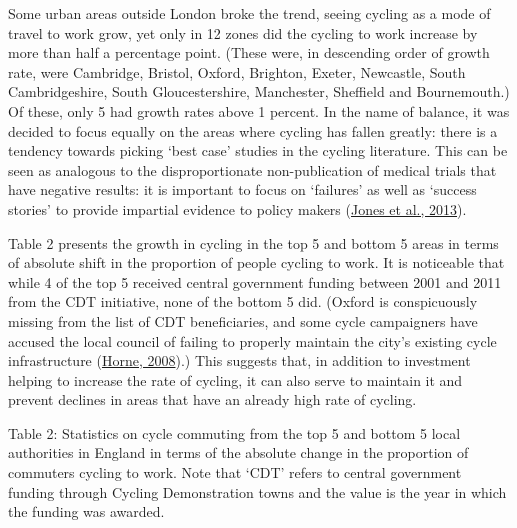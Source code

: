 Some urban areas outside London broke the trend, seeing cycling as a
mode of travel to work grow, yet only in 12 zones did the cycling to
work increase by more than half a percentage point. (These were, in
descending order of growth rate, were Cambridge, Bristol, Oxford,
Brighton, Exeter, Newcastle, South Cambridgeshire, South
Gloucestershire, Manchester, Sheffield and Bournemouth.) Of these, only
5 had growth rates above 1 percent. In the name of balance, it was
decided to focus equally on the areas where cycling has fallen greatly:
there is a tendency towards picking `best case' studies in the cycling
literature. This can be seen as analogous to the disproportionate
non-publication of medical trials that have negative results: it is
important to focus on `failures' as well as `success stories' to provide
impartial evidence to policy makers
(\href{http://www.bmj.com/content/347/bmj.f6104?tab=citation}{Jones et
al., 2013}).

Table 2 presents the growth in cycling in the top 5 and bottom 5 areas
in terms of absolute shift in the proportion of people cycling to work.
It is noticeable that while 4 of the top 5 received central government
funding between 2001 and 2011 from the CDT initiative, none of the
bottom 5 did. (Oxford is conspicuously missing from the list of CDT
beneficiaries, and some cycle campaigners have accused the local council
of failing to properly maintain the city's existing cycle infrastructure
(\href{http://www.oxfordmail.co.uk/news/2296153.print/}{Horne, 2008}).)
This suggests that, in addition to investment helping to increase the
rate of cycling, it can also serve to maintain it and prevent declines
in areas that have an already high rate of cycling.

Table 2: Statistics on cycle commuting from the top 5 and bottom 5 local
authorities in England in terms of the absolute change in the proportion
of commuters cycling to work. Note that `CDT' refers to central
government funding through Cycling Demonstration towns and the value is
the year in which the funding was awarded.

